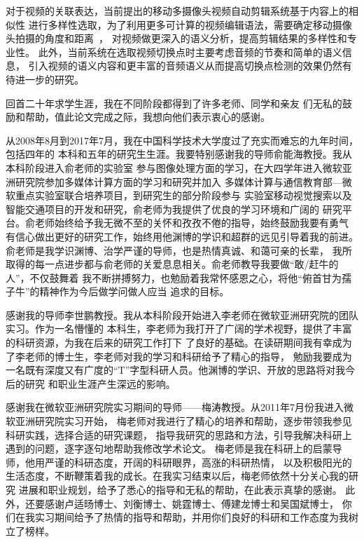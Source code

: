 \documentclass[doctor]{ustcthesis}
\begin{document}
对于视频的关联表达，当前提出的移动多摄像头视频自动剪辑系统基于内容上的相似性
进行多样性选取，为了利用更多可计算的视频编辑语法，需要确定移动摄像头拍摄的角度和距离~\cite{liu2012mm}，
对视频做更深入的语义分析，提高剪辑结果的多样性和专业性。
此外，当前系统在选取视频切换点时主要考虑音频的节奏和简单的语义信息，
引入视频的语义内容和更丰富的音频语义从而提高切换点检测的效果仍然有待进一步的研究。




\nocite{*} %

\appendix

\backmatter
\begin{acknowledgements}

    回首二十年求学生涯，我在不同阶段都得到了许多老师、同学和亲友
    们无私的鼓励和帮助，值此论文完成之际，我想向他们表示衷心的感谢。

    从2008年8月到2017年7月，我在中国科学技术大学度过了充实而难忘的九年时间，包括四年的
    本科和五年的研究生生涯。我要特别感谢我的导师俞能海教授。我从本科阶段进入俞老师的实验室
    参与图像处理方面的学习，在大四学年进入微软亚洲研究院参加多媒体计算方面的学习和研究并加入
    多媒体计算与通信教育部—微软重点实验室联合培养项目，到研究生的部分阶段参与
    实验室移动视觉搜索以及智能交通项目的开发和研究，俞老师为我提供了优良的学习环境和广阔的
    研究平台。俞老师始终给予我无微不至的关怀和孜孜不倦的指导，始终鼓励我要有勇气
    有信心做出更好的研究工作，始终用他渊博的学识和超群的远见引导着我的前进。
    俞老师是我学识渊博、治学严谨的导师，也是热情真诚、和蔼可亲的长辈，
    我所取得的每一点进步都与俞老师的关爱息息相关。俞老师教导我要做``敢/赶牛的人''，不仅鼓舞着
    我不断拼搏努力，也勉励着我常怀感恩之心，将他``俯首甘为孺子牛''的精神作为今后做学问做人应当
    追求的目标。

    感谢我的导师李世鹏教授。我从本科阶段开始进入李老师在微软亚洲研究院的团队实习。作为一名懵懂的
    本科生，李老师为我打开了广阔的学术视野，提供了丰富的科研资源，为我在后来的研究工作打下
    了良好的基础。在读研期间我有幸成为了李老师的博士生，李老师对我的学习和科研给予了精心的指导，
    勉励我要成为一名既有深度又有广度的``T''字型科研人员。他渊博的学识、开放的思路将对我今后的研究
    和职业生涯产生深远的影响。

    感谢我在微软亚洲研究院实习期间的导师——梅涛教授。从2011年7月份我进入微软亚洲研究院实习开始，
    梅老师对我进行了精心的培养和帮助，逐步带领我参见科研实践，选择合适的研究课题，
    指导我研究的思路和方法，引导我解决科研上遇到的问题，逐字逐句地帮助我修改学术论文。
    梅老师是我在科研上的启蒙导师，他用严谨的科研态度，开阔的科研眼界，高涨的科研热情，
    以及积极阳光的生活态度，不断鞭策着我的成长。在我实习结束以后，梅老师依然十分关心我的研究
    进展和职业规划，给予了悉心的指导和无私的帮助，在此表示真挚的感谢。
    此外，还要感谢卢适旸博士、刘衡博士、姚霆博士、傅建龙博士和吴国斌博士，
    你们在我实习期间给予了热情的指导和帮助，并用你们良好的科研和工作态度为我树立了榜样。


\end{acknowledgements}
\end{document}
